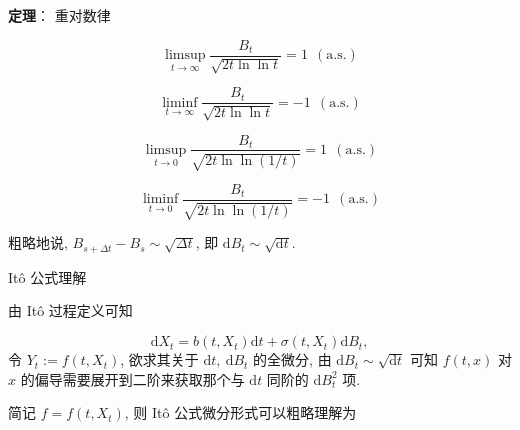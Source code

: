 \documentclass[openany]{ctexbook}
\theoremstyle{kaiti}
\theoremstyle{normal}
\begin{document}
\textbf{定理}： 重对数律

\begin{equation}
  \limsup_{t\to\infty}\frac{B_t}{\sqrt{2t\ln\ln t}}=1~~(\text{a.s.})
\end{equation}

\begin{equation}
  \liminf_{t\to\infty}\frac{B_t}{\sqrt{2t\ln\ln t}}=-1~~(\text{a.s.})
\end{equation}

\begin{equation}
  \limsup_{t\to0}\frac{B_t}{\sqrt{2t\ln\ln (1/t)}}=1~~(\text{a.s.})
\end{equation}

\begin{equation}
  \liminf_{t\to0}\frac{B_t}{\sqrt{2t\ln\ln (1/t)}}=-1~~(\text{a.s.})
\end{equation}

粗略地说, $B_{s+\Delta t}-B_s\sim\sqrt{\Delta t}$, 即 $\mathrm{d}B_t\sim\sqrt{\mathrm{d}t}$.

It\^o 公式理解

由 It\^o 过程定义可知

\begin{equation}
  \mathrm{d}X_t=b(t,X_t)\mathrm{d}t+\sigma(t,X_t)\mathrm{d}B_t,
\end{equation}
令 $Y_t:= f(t,X_t)$, 欲求其关于 $\mathrm{d}t,~\mathrm{d}B_t$ 的全微分, 由 $\mathrm{d}B_t\sim\sqrt{\mathrm{d}t}$ 可知 $f(t,x)$ 对 $x$ 的偏导需要展开到二阶来获取那个与 $\mathrm{d}t$ 同阶的 $\mathrm{d}B_t^2$ 项.

简记 $f=f(t,X_t)$, 则 It\^o 公式微分形式可以粗略理解为
\end{document}
